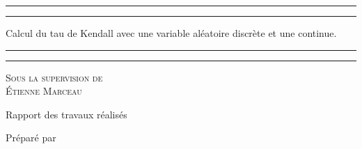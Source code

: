 \documentclass{article}
\begin{document}
	\renewcommand{\tablename}{Tableau}
	
	\begin{titlepage}
		\centering %
		
		\scshape %
		
		\vspace*{7\baselineskip} %
		
		
		\rule{\textwidth}{1.6pt}\vspace*{-\baselineskip}\vspace*{2pt} %
		\rule{\textwidth}{0.4pt} %
		
		\vspace{0.75\baselineskip} %
		{\LARGE Calcul du tau de Kendall avec une variable aléatoire discrète et une continue. \\} %
		\vspace{0.75\baselineskip} %
		
		\rule{\textwidth}{0.4pt}\vspace*{-\baselineskip}\vspace{3.2pt} %
		\rule{\textwidth}{1.6pt} %
		
		\vspace{3\baselineskip} %
		
		{\scshape\Large Sous la supervision de \\Étienne Marceau\\} %
		
		\vspace*{3\baselineskip}
		
		Rapport des travaux réalisés  \\%
		
		\vspace*{3\baselineskip} %
		
		
		Préparé par
		

\end{titlepage}
\end{document}
